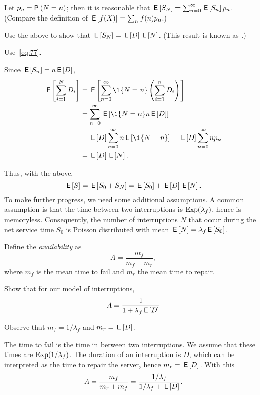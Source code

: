 Let $p_n=\P{N=n}$; then it is reasonable that $\,\mathsf{E}\left[S_N\right]=\sum_{n=0}^\infty \,\mathsf{E}\left[S_n\right]p_n$. (Compare the definition of $\,\mathsf{E}\left[f(X)\right]=\sum_{n} f(n) p_n$.)

\begin{exercise}[\faCalculator]\label{ex:16}
Use the above to show that $\,\mathsf{E}\left[S_N\right]=\,\mathsf{E}\left[D\right] \,\mathsf{E}\left[N\right]$. (This result is known as .)
\begin{hint}
  Use~\eqref{eq:77}. 
\end{hint}
\begin{solution}
Since $\,\mathsf{E}\left[S_n\right] = n \,\mathsf{E}\left[D\right]$, 
\begin{align*}
  \E{\sum_{i=1}^N D_i} 
&=  \E{ \sum_{n=0}^\infty \1{N=n} \left(\sum_{i=1}^n D_i \right)} \\
&=  \sum_{n=0}^\infty \E{\1{N=n} n\E{D}} \\
&=  \E{D} \sum_{n=0}^\infty n \E{\1{N=n}} = \E D \sum_{n=0}^\infty n p_n\\
&= \E D \E N.
\end{align*}
\end{solution}
\end{exercise}

Thus, with the above, 
\begin{equation*}
  \,\mathsf{E}\left[S\right] = \,\mathsf{E}\left[S_0 + S_N\right] = \,\mathsf{E}\left[S_0\right] + \,\mathsf{E}\left[D\right] \,\mathsf{E}\left[N\right].
\end{equation*}
To make further progress, we need some additional assumptions.
A common assumption is that the time between two interruptions is $\operatorname{Exp}(\lambda_f)$, hence is memoryless.
Consequently, the number of interruptions $N$ that occur during the net service time $S_0$ is  Poisson distributed with mean $\,\mathsf{E}\left[N\right] = \lambda_f \,\mathsf{E}\left[S_0\right]$.


Define the \emph{availability} as
\begin{equation*}
  A=\frac{m_f}{m_f + m_r},
\end{equation*}
where $m_f$ is the mean time to fail and $m_r$ the mean time to repair. 
\begin{exercise}[\faFlask]
  Show that  for our model of interruptions,
  \begin{equation*}
A=\frac 1{1+\lambda_f \,\mathsf{E}\left[D\right]}
  \end{equation*}
  \begin{hint}
    Observe that $m_f = 1/\lambda_f$ and $m_r = \,\mathsf{E}\left[D\right]$.
  \end{hint}
  \begin{solution}
The time to fail is the time in between two interruptions. We assume that these times are $\operatorname{Exp}(1/\lambda_f)$. The duration of an interruption is $D$, which can be interpreted as the time to repair the server, hence $m_r = \,\mathsf{E}\left[D\right]$. With this
\begin{equation*}
  A=\frac{m_f}{m_r + m_f}=\frac{1/\lambda_f }{1/\lambda_f + \,\mathsf{E}\left[D\right]}. 
\end{equation*}
  \end{solution}
\end{exercise}


